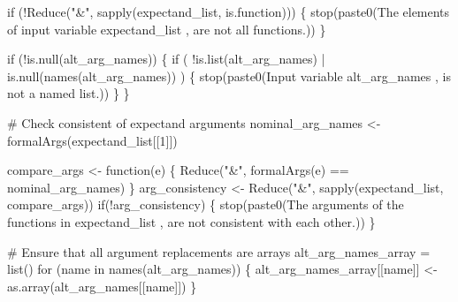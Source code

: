 \documentclass[
  letterpaper,
  DIV=11,
  numbers=noendperiod]{scrartcl}
\newenvironment{Shaded}{\begin{snugshade}}{\end{snugshade}}
\newcommand{\BuiltInTok}[1]{\textcolor[rgb]{0.00,0.23,0.31}{#1}}
\newcommand{\CommentTok}[1]{\textcolor[rgb]{0.37,0.37,0.37}{#1}}
\newcommand{\ControlFlowTok}[1]{\textcolor[rgb]{0.00,0.23,0.31}{#1}}
\newcommand{\DecValTok}[1]{\textcolor[rgb]{0.68,0.00,0.00}{#1}}
\newcommand{\ImportTok}[1]{\textcolor[rgb]{0.00,0.46,0.62}{#1}}
\newcommand{\KeywordTok}[1]{\textcolor[rgb]{0.00,0.23,0.31}{#1}}
\newcommand{\NormalTok}[1]{\textcolor[rgb]{0.00,0.23,0.31}{#1}}
\newcommand{\OperatorTok}[1]{\textcolor[rgb]{0.37,0.37,0.37}{#1}}
\newcommand{\StringTok}[1]{\textcolor[rgb]{0.13,0.47,0.30}{#1}}
\begin{document}
\begin{Shaded}
\begin{Highlighting}[]
  \ControlFlowTok{if}\NormalTok{ (}\OperatorTok{!}\NormalTok{Reduce(}\StringTok{"\&"}\NormalTok{, sapply(expectand\_list, }\KeywordTok{is}\NormalTok{.function))) \{}
\NormalTok{    stop(paste0(}\StringTok{\textquotesingle{}The elements of input variable \textasciigrave{}expectand\_list\textasciigrave{} \textquotesingle{}}\NormalTok{,}
                \StringTok{\textquotesingle{}are not all functions.\textquotesingle{}}\NormalTok{))}
\NormalTok{  \}}

  \ControlFlowTok{if}\NormalTok{ (}\OperatorTok{!}\KeywordTok{is}\NormalTok{.null(alt\_arg\_names)) \{}
    \ControlFlowTok{if}\NormalTok{ ( }\OperatorTok{!}\KeywordTok{is}\NormalTok{.}\BuiltInTok{list}\NormalTok{(alt\_arg\_names) }\OperatorTok{|}
          \KeywordTok{is}\NormalTok{.null(names(alt\_arg\_names)) ) \{}
\NormalTok{      stop(paste0(}\StringTok{\textquotesingle{}Input variable \textasciigrave{}alt\_arg\_names\textasciigrave{} \textquotesingle{}}\NormalTok{,}
                  \StringTok{\textquotesingle{}is not a named list.\textquotesingle{}}\NormalTok{))}
\NormalTok{    \}}
\NormalTok{  \}}

  \CommentTok{\# Check consistent of expectand arguments}
\NormalTok{  nominal\_arg\_names }\OperatorTok{\textless{}{-}}\NormalTok{ formalArgs(expectand\_list[[}\DecValTok{1}\NormalTok{]])}

\NormalTok{  compare\_args }\OperatorTok{\textless{}{-}}\NormalTok{ function(e) \{}
\NormalTok{    Reduce(}\StringTok{"\&"}\NormalTok{, formalArgs(e) }\OperatorTok{==}\NormalTok{ nominal\_arg\_names)}
\NormalTok{  \}}
\NormalTok{  arg\_consistency }\OperatorTok{\textless{}{-}}\NormalTok{ Reduce(}\StringTok{"\&"}\NormalTok{, sapply(expectand\_list, compare\_args))}
  \ControlFlowTok{if}\NormalTok{(}\OperatorTok{!}\NormalTok{arg\_consistency) \{}
\NormalTok{    stop(paste0(}\StringTok{\textquotesingle{}The arguments of the functions in \textasciigrave{}expectand\_list\textasciigrave{} \textquotesingle{}}\NormalTok{,}
                \StringTok{\textquotesingle{}are not consistent with each other.\textquotesingle{}}\NormalTok{))}
\NormalTok{  \}}

  \CommentTok{\# Ensure that all argument replacements are arrays}
\NormalTok{  alt\_arg\_names\_array }\OperatorTok{=} \BuiltInTok{list}\NormalTok{()}
  \ControlFlowTok{for}\NormalTok{ (name }\KeywordTok{in}\NormalTok{ names(alt\_arg\_names)) \{}
\NormalTok{    alt\_arg\_names\_array[[name]] }\OperatorTok{\textless{}{-}} \ImportTok{as}\NormalTok{.array(alt\_arg\_names[[name]])}
\NormalTok{  \}}


\end{Highlighting}
\end{Shaded}
\end{document}
